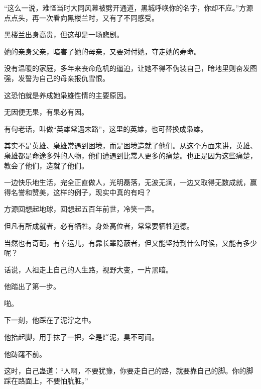 \begin{this_body}
“这么一说，难怪当时大同风幕被劈开通道，黑城呼唤你的名字，你却不应。”方源点点头，再一次看向黑楼兰时，又有了不同感受。

黑楼兰出身高贵，但这却是一场悲剧。

她的亲身父亲，暗害了她的母亲，又要对付她，夺走她的寿命。

没有温暖的家庭，多年来丧命危机的逼迫，让她不得不伪装自己，暗地里则奋发图强，发誓为自己的母亲报仇雪恨。

这恐怕就是养成她枭雄性情的主要原因。

无因便无果，有果必有因。

有句老话，叫做“英雄常遇末路”，这里的英雄，也可替换成枭雄。

其实不是英雄、枭雄常遇到困境，而是困境造就了他们。从这个方面来讲，英雄、枭雄都是命途多舛的人物，他们遭遇到比常人更多的痛楚。也正是因为这些痛楚，教会了他们，造就了他们。

一边快乐地生活，完全正直做人，光明磊落，无波无澜，一边又取得无数成就，赢得名誉和赞美，这样的例子，现实中真的有吗？

方源回想起地球，回想起五百年前世，冷笑一声。

但凡有所成就者，必有牺牲。身处高位者，常常要牺牲道德。

当然也有奇葩，有幸运儿，有靠长辈隐蔽者，但又能坚持到什么时候，又能有多少呢？

话说，人祖走上自己的人生路，视野大变，一片黑暗。

他踏出了第一步。

啪。

下一刻，他踩在了泥泞之中。

他抬起脚，用手抹了一把，全是烂泥，臭不可闻。

他踌躇不前。

这时，自己蛊道：“人啊，不要犹豫，你要走自己的路，就要靠自己的脚。你的脚踩在路面上，不要怕肮脏。”

\end{this_body}

